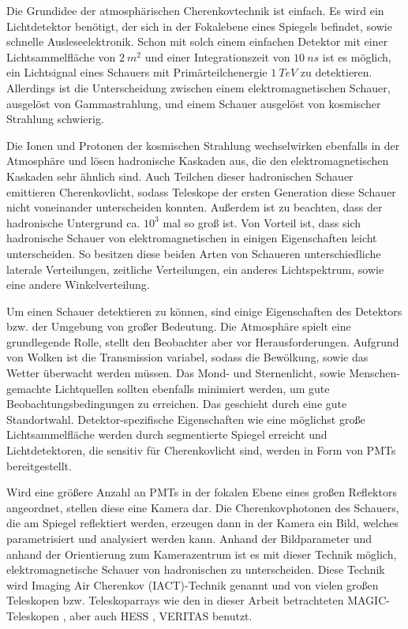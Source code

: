 Die Grundidee der atmosphärischen Cherenkovtechnik ist einfach.
Es wird ein Lichtdetektor benötigt, der sich in der Fokalebene eines Spiegels befindet, sowie schnelle Ausleseelektronik.
Schon mit solch einem einfachen Detektor mit einer Lichtsammelfläche von $\SI{2}{m^2}$ und einer Integrationszeit von $\SI{10}{ns}$ ist es möglich, ein Lichtsignal eines Schauers mit Primärteilchenergie $\SI{1}{TeV}$ zu detektieren.
Allerdings ist die Unterscheidung zwischen einem elektromagnetischen Schauer, ausgelöst von Gammastrahlung, und einem Schauer ausgelöst von kosmischer Strahlung schwierig.\cite{Weekes}

Die Ionen und Protonen der kosmischen Strahlung wechselwirken ebenfalls in der Atmosphäre und lösen hadronische Kaskaden aus, die den elektromagnetischen Kaskaden sehr ähnlich sind.
Auch Teilchen dieser hadronischen Schauer emittieren Cherenkovlicht, sodass Teleskope der ersten Generation diese Schauer nicht voneinander unterscheiden konnten.
Außerdem ist zu beachten, dass der hadronische Untergrund ca. $10^3$ mal so groß ist.
Von Vorteil ist, dass sich hadronische Schauer von elektromagnetischen in einigen Eigenschaften leicht unterscheiden.
So besitzen diese beiden Arten von Schaueren unterschiedliche laterale Verteilungen, zeitliche Verteilungen, ein anderes Lichtspektrum, sowie eine andere Winkelverteilung.\cite{Weekes}

Um einen Schauer detektieren zu können, sind einige Eigenschaften des Detektors bzw. der Umgebung von großer Bedeutung.
Die Atmosphäre spielt eine grundlegende Rolle, stellt den Beobachter aber vor Herausforderungen. 
Aufgrund von Wolken ist die Transmission variabel, sodass die Bewölkung, sowie das Wetter überwacht werden müssen.
Das Mond- und Sternenlicht, sowie Menschen-gemachte Lichtquellen sollten ebenfalls minimiert werden, um gute Beobachtungsbedingungen zu erreichen. 
Das geschieht durch eine gute Standortwahl.
Detektor-spezifische Eigenschaften wie eine möglichst große Lichtsammelfläche werden durch segmentierte Spiegel erreicht und Lichtdetektoren, die sensitiv für Cherenkovlicht sind, werden in Form von PMTs bereitgestellt.\cite{Weekes}

Wird eine größere Anzahl an PMTs in der fokalen Ebene eines großen Reflektors angeordnet, stellen diese eine Kamera dar.
Die Cherenkovphotonen des Schauers, die am Spiegel reflektiert werden, erzeugen dann in der Kamera ein Bild, welches parametrisiert und analysiert werden kann.
Anhand der Bildparameter und anhand der Orientierung zum Kamerazentrum ist es mit dieser Technik möglich, elektromagnetische Schauer von hadronischen zu unterscheiden.
Diese Technik wird Imaging Air Cherenkov (IACT)-Technik genannt und von vielen großen Teleskopen bzw. Teleskoparrays wie den in dieser Arbeit betrachteten MAGIC-Teleskopen \cite{MAGIC_Telescopes}, aber auch HESS \cite{HESS}, VERITAS \cite{VERITAS} benutzt.\cite{Weekes}

